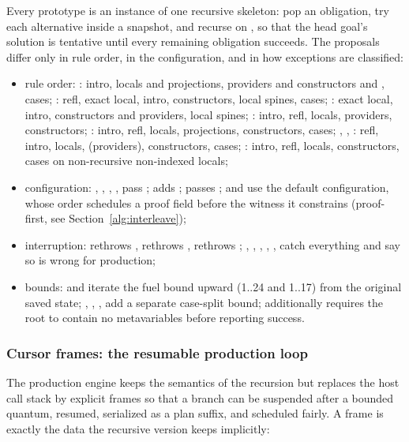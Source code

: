 Every prototype is an instance of one recursive skeleton: pop an obligation, try each alternative inside a snapshot, and recurse on , so that the head goal's solution is tentative until every remaining obligation succeeds. The proposals differ only in rule order, in the  configuration, and in how exceptions are classified:
\begin{itemize}
\item rule order: : intro, locals and projections, providers and constructors and , cases; : refl, exact local, intro, constructors, local spines, cases; : exact local, intro, constructors and providers, local spines; : intro, refl, locals, providers, constructors; : intro, refl, locals, projections, constructors, cases; , , : refl, intro, locals, (providers), constructors, cases; : intro, refl, locals, constructors, cases on non-recursive non-indexed locals;
\item {} configuration: , , , ,  pass ;  adds ;  passes ;  and  use the default configuration, whose  order schedules a proof field before the witness it constrains (proof-first, see Section~\ref{alg:interleave});
\item interruption:  rethrows ,  rethrows ,  rethrows ; , , , , ,  catch everything and say so is wrong for production;
\item bounds:  and  iterate the fuel bound upward (1..24 and 1..17) from the original saved state; , , ,  add a separate case-split bound;  additionally requires the root to contain no metavariables before reporting success.
\end{itemize}

\subsubsection{Cursor frames: the resumable production loop}

The production engine keeps the semantics of the recursion but replaces the host call stack by explicit frames so that a branch can be suspended after a bounded quantum, resumed, serialized as a plan suffix, and scheduled fairly. A frame is exactly the data the recursive version keeps implicitly:

